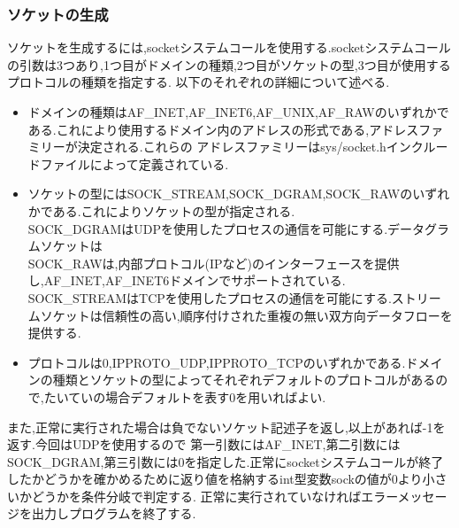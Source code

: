 \documentclass[dvipdfmx]{jarticle}
\begin{document}
\subsubsection{ソケットの生成}
ソケットを生成するには,socketシステムコールを使用する.socketシステムコールの引数は3つあり,1つ目がドメインの種類,2つ目がソケットの型,3つ目が使用するプロトコルの種類を指定する.
以下のそれぞれの詳細について述べる.\cite{2}\cite{3}
\begin{itemize}
    \item ドメインの種類はAF\_INET,AF\_INET6,AF\_UNIX,AF\_RAWのいずれかである.これにより使用するドメイン内のアドレスの形式である,アドレスファミリーが決定される.これらの
    アドレスファミリーはsys/socket.hインクルードファイルによって定義されている.
    \item ソケットの型にはSOCK\_STREAM,SOCK\_DGRAM,SOCK\_RAWのいずれかである.これによりソケットの型が指定される.
    \\SOCK\_DGRAMはUDPを使用したプロセスの通信を可能にする.データグラムソケットは
    \\SOCK\_RAWは,内部プロトコル(IPなど)のインターフェースを提供し,AF\_INET,AF\_INET6ドメインでサポートされている.
    \\SOCK\_STREAMはTCPを使用したプロセスの通信を可能にする.ストリームソケットは信頼性の高い,順序付けされた重複の無い双方向データフローを提供する.
    \item プロトコルは0,IPPROTO\_UDP,IPPROTO\_TCPのいずれかである.ドメインの種類とソケットの型によってそれぞれデフォルトのプロトコルがあるので,たいていの場合デフォルトを表す0を用いればよい.
\end{itemize}
また,正常に実行された場合は負でないソケット記述子を返し,以上があれば-1を返す.今回はUDPを使用するので
第一引数にはAF\_INET,第二引数にはSOCK\_DGRAM,第三引数には0を指定した.正常にsocketシステムコールが終了したかどうかを確かめるために返り値を格納するint型変数sockの値が0より小さいかどうかを条件分岐で判定する.
正常に実行されていなければエラーメッセージを出力しプログラムを終了する.
\end{document}
